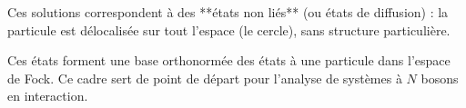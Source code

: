 Ces solutions correspondent à des **états non liés** (ou états de diffusion) : la particule est délocalisée sur tout l’espace (le cercle), sans structure particulière.

Ces états forment une base orthonormée des états à une particule dans l’espace de Fock. Ce cadre sert de point de départ pour l’analyse de systèmes à \(N\) bosons en interaction.




